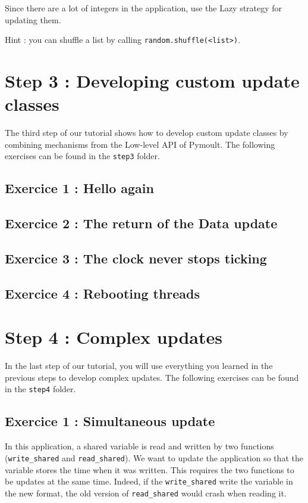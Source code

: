 \documentclass{article}
\begin{document}
Since there are a lot of integers in the application, use the Lazy
strategy for updating them.

Hint : you can shuffle a list by calling \texttt{random.shuffle(<list>)}.

\section{Step 3 : Developing custom update classes}

The third step of our tutorial shows how to develop custom update
classes by combining mechanisms from the Low-level API of Pymoult. The
following exercises can be found in the \texttt{step3} folder.

\subsection{Exercice 1 : Hello again}

\subsection{Exercice 2 : The return of the Data update}

\subsection{Exercice 3 : The clock never stops ticking}

\subsection{Exercice 4 : Rebooting threads}


\section{Step 4 : Complex updates}

In the last step of our tutorial, you will use everything you learned
in the previous steps to develop complex updates. The
following exercises can be found in the \texttt{step4} folder.

\subsection{Exercice 1 : Simultaneous update}

In this application, a shared variable is read and written by two
functions (\texttt{write\_shared} and \texttt{read\_shared}). We want
to update the application so that the variable stores the time when it
was written. This requires the two functions to be updates at the same
time. Indeed, if the \texttt{write\_shared} write the variable in the
new format, the old version of \texttt{read\_shared} would crash when
reading it.
\end{document}
